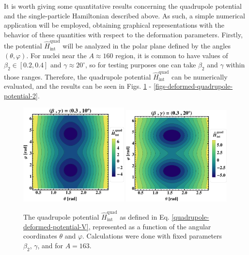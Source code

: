 It is worth giving some quantitative results concerning the quadrupole potential and the single-particle Hamiltonian described above. As such, a simple numerical application will be employed, obtaining graphical representations with the behavior of these quantities with respect to the deformation parameters. Firstly, the potential $\hat{H}_\text{int}^\text{quad}$ will be analyzed in the polar plane defined by the angles $(\theta,\varphi)$. For nuclei near the $A\approx 160$ region, it is common to have values of $\beta_2\in\left[0.2,0.4\right]$ and $\gamma\approx 20^\circ$, so for testing purposes one can take $\beta_2$ and $\gamma$ within those ranges. Therefore, the quadrupole potential $\hat{H}_\text{int}^\text{quad}$ can be numerically evaluated, and the results can be seen in Figs. \ref{figs-deformed-quadrupole-potential-1} - \ref{figs-deformed-quadrupole-potential-2}.
\begin{figure}
    \centering
    \includegraphics[width=0.49\textwidth]{Chapters/Figures/quadrupole-potentialV-1.pdf}
    \includegraphics[width=0.49\textwidth]{Chapters/Figures/quadrupole-potentialV-2.pdf}
    \caption{The quadrupole potential $\hat{H}_\text{int}^\text{quad}$ as defined in Eq. \ref{quadrupole-deformed-potential-V}, represented as a function of the angular coordinates $\theta$ and $\varphi$. Calculations were done with fixed parameters $\beta_2$, $\gamma$, and for $A=163$.}
    \label{figs-deformed-quadrupole-potential-1}
\end{figure}

